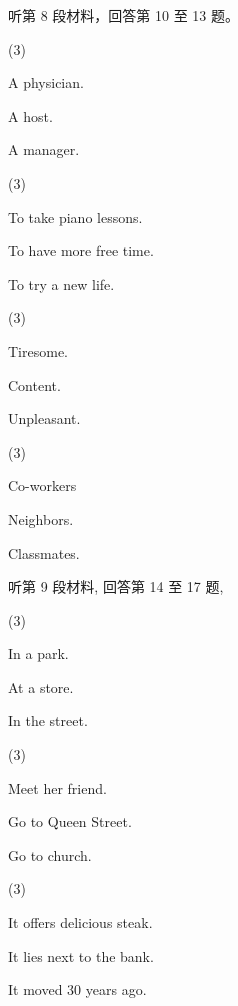 \documentclass{英语试卷}
\begin{document}
\par 听第 8 段材料，回答第 10 至 13 题。\par
{}
\begin{choices}(3)
  \item A physician.
  \item A host.
  \item A manager.
\end{choices}
\begin{choices}(3)
  \item To take piano lessons.
  \item To have more free time.
  \item To try a new life.
\end{choices}
\begin{choices}(3)
  \item Tiresome.
  \item Content.
  \item Unpleasant.
\end{choices}
\begin{choices}(3)
  \item Co-workers
  \item Neighbors.
  \item Classmates.
\end{choices}
\par 听第 9 段材料, 回答第 14 至 17 题,\par
{}
\begin{choices}(3)
  \item In a park.
  \item At a store.
  \item In the street.
\end{choices}
\begin{choices}(3)
  \item Meet her friend.
  \item Go to Queen Street.
  \item Go to church.
\end{choices}
\begin{choices}(3)
  \item It offers delicious steak.
  \item It lies next to the bank.
  \item It moved 30 years ago.
\end{choices}
\end{document}

